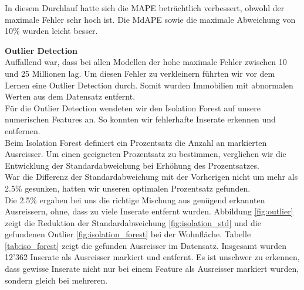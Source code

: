 \begin{table}[ht]
\centering
{}
\caption{Ergebnisse mit Einbezug der Lärmbelastung}
\label{tab:fourth_round}
\end{table}

In diesem Durchlauf hatte sich die MAPE beträchtlich verbessert, obwohl der maximale Fehler sehr hoch ist. Die MdAPE sowie die maximale Abweichung von 10\% wurden leicht besser.

\newpage
\textbf{Outlier Detection}\\
Auffallend war, dass bei allen Modellen der hohe maximale Fehler zwischen 10 und 25 Millionen lag. Um diesen Fehler zu verkleinern führten wir vor dem Lernen eine Outlier Detection durch. Somit wurden Immobilien mit abnormalen Werten aus dem Datensatz entfernt.\\
Für die Outlier Detection wendeten wir den Isolation Forest auf unsere numerischen Features an. So konnten wir fehlerhafte Inserate erkennen und entfernen.\\[2ex]
%
Beim Isolation Forest definiert ein Prozentsatz die Anzahl an markierten Ausreisser.
Um einen geeigneten Prozentsatz zu bestimmen, verglichen wir die Entwicklung der Standardabweichung bei Erhöhung des Prozentsatzes.\\
War die Differenz der Standardabweichung mit der Vorherigen nicht um mehr als 2.5\% gesunken, hatten wir unseren optimalen Prozentsatz gefunden.\\
Die 2.5\% ergaben bei uns die richtige Mischung aus genügend erkannten Ausreissern, ohne, dass zu viele Inserate entfernt wurden.
Abbildung \ref{fig:outlier} zeigt die Reduktion der Standardabweichung \ref{fig:isolation_std} und die gefundenen Outlier \ref{fig:isolation_forest} bei der Wohnfläche. Tabelle \ref{tab:iso_forest} zeigt die gefunden Ausreisser im Datensatz. Insgesamt wurden 12'362 Inserate als Ausreisser markiert und entfernt. 
Es ist unschwer zu erkennen, dass gewisse Inserate nicht nur bei einem Feature als Ausreisser markiert wurden, sondern gleich bei mehreren.

